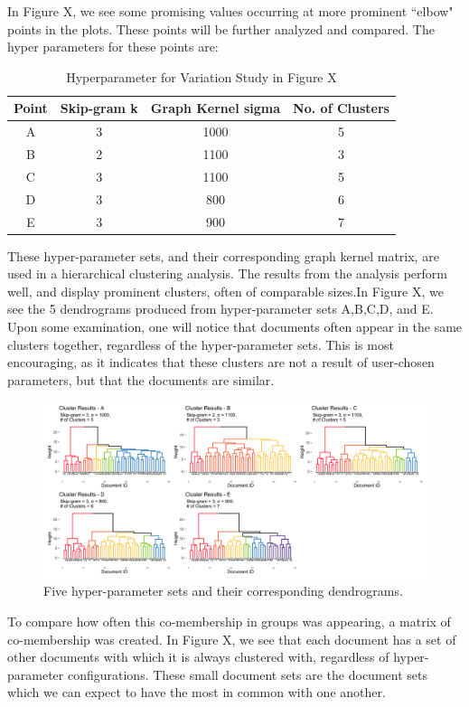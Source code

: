 In Figure X, we see some promising values occurring at more prominent ``elbow" points in the plots. These points will be further analyzed and compared. The hyper parameters for these points are:\\

\begin{table}
\begin{tabular}{c|c|c|c}
Point&Skip-gram k& Graph Kernel sigma&No. of Clusters \\
\hline
A&3&1000&5\\
B&2&1100&3\\
C&3&1100&5\\
D&3&800&6\\
E&3&900&7
\end{tabular}
\caption{Hyperparameter for Variation Study in Figure X}
\end{table}

These hyper-parameter sets, and their corresponding graph kernel matrix, are used in a hierarchical clustering analysis. The results from the analysis perform well, and display prominent clusters, often of comparable sizes.In Figure X, we see the 5 dendrograms produced from hyper-parameter sets A,B,C,D, and E. Upon some examination, one will notice that documents often appear in the same clusters together, regardless of the hyper-parameter sets. This is most encouraging, as it indicates that these clusters are not a result of user-chosen parameters, but that the documents are similar. \\

\begin{figure}
\includegraphics[width=6in]{Content/Images/5cluster.png}
\caption{Five hyper-parameter sets and their corresponding dendrograms.}
\end{figure}

To compare how often this co-membership in groups was appearing, a matrix of co-membership was created. In Figure X, we see that each document has a set of other documents with which it is always clustered with, regardless of hyper-parameter configurations. These small document sets are the document sets which we can expect to have the most in common with one another.\\

